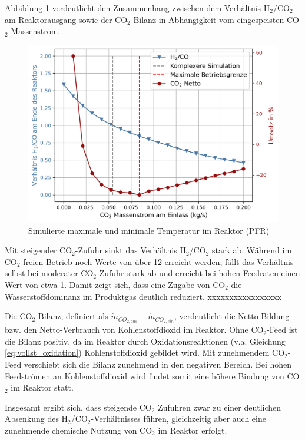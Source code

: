     Abbildung \ref{fig:parameterstudie_bilanz} verdeutlicht den Zusammenhang zwischen dem Verhältnis H$_2$/CO$_2$ am Reaktorausgang sowie der CO$_2$-Bilanz in Abhängigkeit vom eingespeisten CO$_2$-Massenstrom. 
    \begin{figure}[H]
        \centering
        \includegraphics[width=0.9\linewidth]{img/Parameterstudie_CO2/Parameterstudie_CO2_Bilanz.png}
        \caption{Simulierte maximale und minimale Temperatur im Reaktor (PFR)}
        \label{fig:parameterstudie_bilanz}
    \end{figure}
    Mit steigender CO$_2$-Zufuhr sinkt das Verhältnis H$_2$/CO$_2$ stark ab. Während im CO$_2$-freien Betrieb noch Werte von über 12 erreicht werden, fällt das Verhältnis selbst bei moderater CO$_2$ Zufuhr stark ab und erreicht bei hohen Feedraten einen Wert von etwa 1. Damit zeigt sich, dass eine Zugabe von CO$_2$ die Wasserstoffdominanz im Produktgas deutlich reduziert. xxxxxxxxxxxxxxxxx %

    Die CO$_2$-Bilanz, definiert als $\dot m_{CO_{2,aus}}-\dot m_{CO_{2,ein}}$, verdeutlicht die Netto-Bildung bzw. den Netto-Verbrauch von Kohlenstoffdioxid im Reaktor. Ohne CO$_2$-Feed ist die Bilanz positiv, da im Reaktor durch Oxidationsreaktionen (v.a. Gleichung \ref{eq:vollst_oxidation}) Kohlenstoffdioxid gebildet wird. Mit zunehmendem CO$_2$-Feed verschiebt sich die Bilanz zunehmend in den negativen Bereich. Bei hohen Feedströmen an Kohlenstoffdioxid wird findet somit eine höhere Bindung von CO$_2$ im Reaktor statt.

    Insgesamt ergibt sich, dass steigende CO$_2$ Zufuhren zwar zu einer deutlichen Absenkung des H$_2$/CO$_2$-Verhältnisses führen, gleichzeitig aber auch eine zunehmende chemische Nutzung von CO$_2$ im Reaktor erfolgt. 
